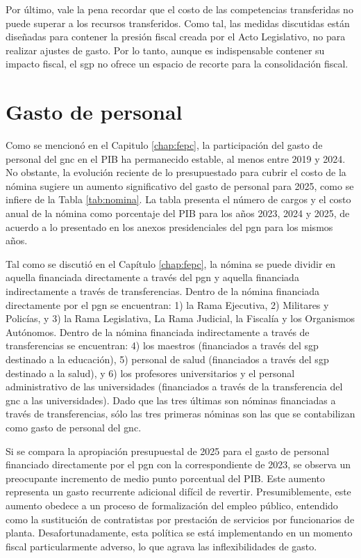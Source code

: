 Por último, vale la pena recordar que el costo de las competencias transferidas no puede superar a los recursos transferidos. Como tal, las medidas discutidas están diseñadas para contener la presión fiscal creada por el Acto Legislativo, no para realizar ajustes de gasto. Por lo tanto, aunque es indispensable contener su impacto fiscal, el \gls{sgp} no ofrece un espacio de recorte para la consolidación fiscal.


\section{Gasto de personal}

Como se mencionó en el Capitulo \ref{chap:fepc}, la participación del gasto de personal del \gls{gnc} en el PIB ha permanecido estable, al menos entre 2019 y 2024. No obstante, la evolución reciente de lo presupuestado para cubrir el costo de la nómina sugiere un aumento significativo del gasto de personal para 2025, como se infiere de la Tabla \ref{tab:nomina}. La tabla presenta el número de cargos y el costo anual de la nómina como porcentaje del PIB para los años 2023, 2024 y 2025, de acuerdo a lo presentado en los anexos presidenciales del \gls{pgn} para los mismos años. 



Tal como se discutió en el Capítulo \ref{chap:fepc}, la nómina se puede dividir en aquella financiada directamente a través del \gls{pgn} y aquella financiada indirectamente a través de transferencias. Dentro de la nómina financiada directamente por el \gls{pgn} se encuentran: 1) la Rama Ejecutiva, 2) Militares y Policías, y 3) la Rama Legislativa, La Rama Judicial, la Fiscalía y los Organismos Autónomos. Dentro de la nómina financiada indirectamente a través de transferencias se encuentran: 4) los maestros (financiados a través del \gls{sgp} destinado a la educación), 5) personal de salud (financiados a través del \gls{sgp} destinado a la salud), y 6) los profesores universitarios y el personal administrativo de las universidades (financiados a través de la transferencia del \gls{gnc} a las universidades). Dado que las tres últimas son nóminas financiadas a través de transferencias, sólo las tres primeras nóminas son las que se contabilizan como gasto de personal del \gls{gnc}.

Si se compara la apropiación presupuestal de 2025 para el gasto de personal financiado directamente por el \gls{pgn} con la correspondiente de 2023, se observa un preocupante incremento de medio punto porcentual del PIB. Este aumento representa un gasto recurrente adicional difícil de revertir. Presumiblemente, este aumento obedece a un proceso de formalización del empleo público, entendido como la sustitución de contratistas por prestación de servicios por funcionarios de planta. Desafortunadamente, esta política se está implementando en un momento fiscal particularmente adverso, lo que agrava las inflexibilidades de gasto. 

